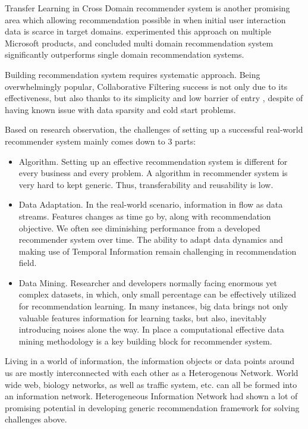 Transfer Learning \citep{Pan2010} in Cross Domain recommender system is another promising area which allowing recommendation possible in when initial user interaction data is scarce in target domains. \citet{Elkahky2015} experimented this approach on multiple Microsoft products, and concluded multi domain recommendation system significantly outperforms single domain recommendation systems. 


Building recommendation system requires systematic approach. Being overwhelmingly popular, Collaborative Filtering success is not only due to its effectiveness, but also thanks to its simplicity and low barrier of entry \citep{Amatriain2016}, despite of having known issue with data sparsity and cold start problems.

Based on research observation, the challenges of setting up a successful real-world recommender system mainly comes down to 3 parts:  

\begin{itemize}
\item Algorithm. Setting up an effective recommendation system is different for every business and every problem. A algorithm in recommender system is very hard to kept generic. Thus, transferability and reusability is low.

\item Data Adaptation. In the real-world scenario, information in flow as data streams. Features changes as time go by, along with recommendation objective. We often see diminishing performance from a developed recommender system over time. The ability to adapt data dynamics and making use of Temporal Information remain challenging in recommendation field.

\item Data Mining. Researcher and developers normally facing enormous yet complex datasets, in which, only small percentage can be effectively utilized for recommendation learning. In many instances, big data brings not only valuable features information for learning tasks, but also, inevitably introducing noises alone the way. In place a computational effective data mining methodology is a key building block for recommender system.
\end{itemize}

Living in a world of information, the information objects or data points around us are mostly interconnected with each other as a Heterogenous Network. World wide web, biology networks, as well as traffic system, etc. can all be formed into an information network. Heterogeneous Information Network had shown a lot of promising potential in developing generic recommendation framework for solving challenges above.



